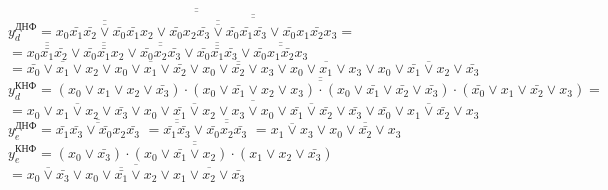 \documentclass{bmstu}
\begin{document}
	$y^{\text{ДНФ}}_d = \overline{\overline{
			\overline{\overline{
					x_0 \bar{x_1} \bar{x_2} \vee \bar{x_0} \bar{x_1} x_2 
			}} \vee 
			\overline{\overline{
					\overline{\overline{
							\bar{x_0} x_2 \bar{x_3} \vee \bar{x_0} \bar{x_1} \bar{x_3}
					}} \vee \bar{x_0} x_1 \bar{x_2} x_3
			}}
	}} =$ \\
	$= \overline{\overline{x_0 \bar{x_1} \bar{x_2}}} \vee \overline{\overline{\bar{x_0} \bar{x_1} x_2}} \vee \overline{\overline{\bar{x_0} x_2 \bar{x_3}}} \vee \overline{\overline{\bar{x_0} \bar{x_1} \bar{x_3}}} \vee \overline{\overline{\bar{x_0} x_1 \bar{x_2} x_3}}$ \\
	$= \overline{\bar{x_0} \vee x_1 \vee x_2} \vee \overline{x_0 \vee x_1 \vee \bar{x_2}} \vee \overline{x_0 \vee \bar{x_2} \vee x_3} \vee \overline{x_0 \vee x_1 \vee x_3} \vee \overline{x_0 \vee \bar{x_1} \vee x_2 \vee \bar{x_3}}$ \\
	$y^{\text{КНФ}}_d = \overline{\overline{(x_0 \vee x_1 \vee x_2 \vee \bar{x_3}) \cdot (x_0 \vee \bar{x_1} \vee x_2 \vee x_3) \cdot (x_0 \vee \bar{x_1} \vee \bar{x_2} \vee \bar{x_3}) \cdot (\bar{x_0} \vee x_1  \vee \bar{x_2} \vee x_3)}} =$ \\
	$=\overline{\overline{x_0 \vee x_1 \vee x_2 \vee \bar{x_3}} \vee\overline{x_0 \vee \bar{x_1} \vee x_2 \vee x_3} \vee \overline{x_0 \vee \bar{x_1} \vee \bar{x_2} \vee \bar{x_3}} \vee \overline{\bar{x_0} \vee x_1  \vee \bar{x_2} \vee x_3}}$ \\
	
	$y^{\text{ДНФ}}_e = \overline{\overline{\bar{x_1} \bar{x_3} \vee \bar{x_0} x_2 \bar{x_3}}} $
	$= \overline{\overline{\bar{x_1} \bar{x_3}}} \vee \overline{\overline{\bar{x_0} x_2 \bar{x_3}}} $
	$= \overline{x_1 \vee x_3} \vee \overline{x_0 \vee \bar{x_2} \vee x_3}$ \\
	$y^{\text{КНФ}}_e = \overline{\overline{(x_0 \vee \bar{x_3}) \cdot (x_0 \vee \bar{x_1} \vee x_2) \cdot (x_1 \vee x_2 \vee \bar{x_3})}}$ \\
	$= \overline{\overline{x_0 \vee \bar{x_3}} \vee \overline{x_0 \vee \bar{x_1} \vee x_2} \vee \overline{x_1 \vee x_2 \vee \bar{x_3}}}$ \\
	
\end{document}
